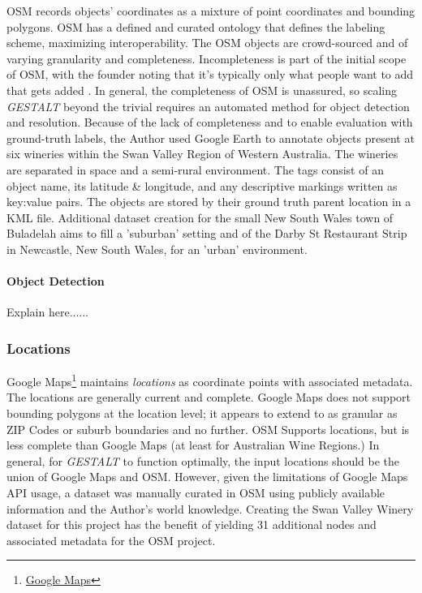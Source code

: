 OSM records objects' coordinates as a mixture of point coordinates and bounding polygons. 
OSM has a defined and curated ontology that defines the labeling scheme, maximizing interoperability. 
The OSM objects are crowd-sourced and of varying granularity and completeness. Incompleteness is part of the initial scope of OSM, with the founder noting that it's typically only what people want to add that gets added \cite{Haklay2008}.
In general, the completeness of OSM is unassured, so scaling \textit{GESTALT} beyond the trivial requires an automated method for object detection and resolution. 
Because of the lack of completeness and to enable evaluation with ground-truth labels, the Author used Google Earth to annotate objects present at six wineries within the Swan Valley Region of Western Australia. The wineries are separated in space and a semi-rural environment. The tags consist of an object name, its latitude \& longitude, and any descriptive markings written as key:value pairs. The objects are stored by their ground truth parent location in a KML file. Additional dataset creation for the small New South Wales town of Buladelah aims to fill a 'suburban' setting and of the Darby St Restaurant Strip in Newcastle, New South Wales, for an 'urban' environment. 

\paragraph{Object Detection}
Explain here......


\subsubsection{Locations}
Google Maps\footnote{\href{https://www.google.com/maps/about/}{Google Maps}} maintains \textit{locations} as coordinate points with associated metadata. The locations are generally current and complete. 
Google Maps does not support bounding polygons at the location level; it appears to extend to as granular as ZIP Codes or suburb boundaries and no further. 
OSM Supports locations, but is less complete than Google Maps (at least for Australian Wine Regions.)
In general, for \textit{GESTALT} to function optimally, the input locations should be the union of Google Maps and OSM. However, given the limitations of Google Maps API usage, a dataset was manually curated in OSM using publicly available information and the Author's world knowledge. 
Creating the Swan Valley Winery dataset for this project has the benefit of yielding 31 additional nodes and associated metadata for the OSM project. 



